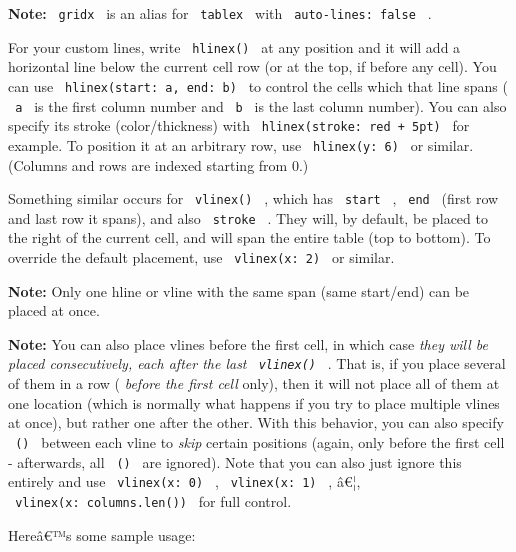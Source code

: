 \textbf{Note:} \texttt{\ gridx\ } is an alias for \texttt{\ tablex\ }
with \texttt{\ auto-lines:\ false\ } .

For your custom lines, write \texttt{\ hlinex()\ } at any position and
it will add a horizontal line below the current cell row (or at the top,
if before any cell). You can use
\texttt{\ hlinex(start:\ a,\ end:\ b)\ } to control the cells which that
line spans ( \texttt{\ a\ } is the first column number and
\texttt{\ b\ } is the last column number). You can also specify its
stroke (color/thickness) with \texttt{\ hlinex(stroke:\ red\ +\ 5pt)\ }
for example. To position it at an arbitrary row, use
\texttt{\ hlinex(y:\ 6)\ } or similar. (Columns and rows are indexed
starting from 0.)

Something similar occurs for \texttt{\ vlinex()\ } , which has
\texttt{\ start\ } , \texttt{\ end\ } (first row and last row it spans),
and also \texttt{\ stroke\ } . They will, by default, be placed to the
right of the current cell, and will span the entire table (top to
bottom). To override the default placement, use
\texttt{\ vlinex(x:\ 2)\ } or similar.

\textbf{Note:} Only one hline or vline with the same span (same
start/end) can be placed at once.

\textbf{Note:} You can also place vlines before the first cell, in which
case \emph{they will be placed consecutively, each after the last
\texttt{\ vlinex()\ }} . That is, if you place several of them in a row
( \emph{before the first cell} only), then it will not place all of them
at one location (which is normally what happens if you try to place
multiple vlines at once), but rather one after the other. With this
behavior, you can also specify \texttt{\ ()\ } between each vline to
\emph{skip} certain positions (again, only before the first cell -
afterwards, all \texttt{\ ()\ } are ignored). Note that you can also
just ignore this entirely and use \texttt{\ vlinex(x:\ 0)\ } ,
\texttt{\ vlinex(x:\ 1)\ } , â€¦, \texttt{\ vlinex(x:\ columns.len())\ }
for full control.

Hereâ€™s some sample usage:


